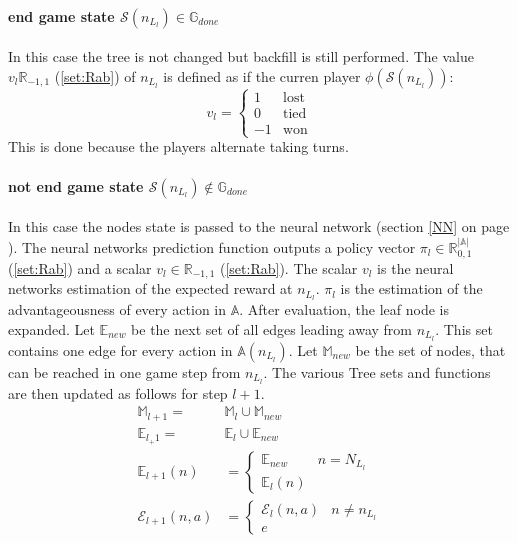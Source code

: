 \documentclass[12pt]{article}
\newcommand{\sectionref}[1]{section \ref{#1} on page \pageref{#1}}
\newcommand{\quckeq}[1]{(\ref{#1})}
\begin{document}
\paragraph{end game state \(\mathcal S(n_{L_l}) \in \mathbb G_{done}\)}
In this case the tree is not changed but backfill is still performed. The value \(v_l \mathbb R_{-1,1}\) \quckeq{set:Rab} of \(n_{L_l}\) is defined as if the curren player \(\phi(\mathcal S(n_{L_l}))\):
\begin{equation}
v_l = \left\{\begin{matrix}
1 &  \text{lost}\\
0 & \text{tied}\\
-1 & \text{won}
\end{matrix}\right.
\end{equation}
This is done because the players alternate taking turns.
\paragraph{not end game state \(\mathcal S(n_{L_l}) \not\in \mathbb G_{done}\)}
In this case the nodes state is passed to the neural network (\sectionref{NN}). The neural networks prediction function outputs a policy vector \(\pi_l \in \mathbb R_{0,1}^{|\mathbb A|}\) \quckeq{set:Rab} and a scalar \(v_l \in \mathbb R_{-1,1}\) \quckeq{set:Rab}. The scalar \(v_l\) is the neural networks estimation of the expected reward at \(n_{L_l}\). \(\pi_l\) is the estimation of the advantageousness of every action in \(\mathbb A\). After evaluation, the leaf node is expanded.
Let \(\mathbb E_{new}\) be the next set of all edges leading away from \(n_{L_l}\). This set contains one edge for every action in \(\mathbb A(n_{L_l})\).
Let \(\mathbb M_{new}\) be the set of nodes, that can be reached in one game step from \(n_{L_l}\).
The various Tree sets and functions are then updated as follows for step \(l+1\).
\begin{align}
\mathbb M_{l+1}   =& \mathbb M_l \cup \mathbb M_{new} \\
\mathbb E_{l_+1}  =& \mathbb E_l  \cup \mathbb E_{new} \\
%
\mathbb E_{l+1}(n) &= 
\left\{
\begin{matrix}
\mathbb E_{new} & n = N_{L_l}\\
\mathbb E_l(n)
\end{matrix}
\right.\\
%
\mathcal E_{l+1}(n, a) &=
\left\{
\begin{matrix}
\mathcal E_l (n, a) & n\neq n_{L_l}\\
e &
\end{matrix}
\right.
\end{align}
\end{document}
